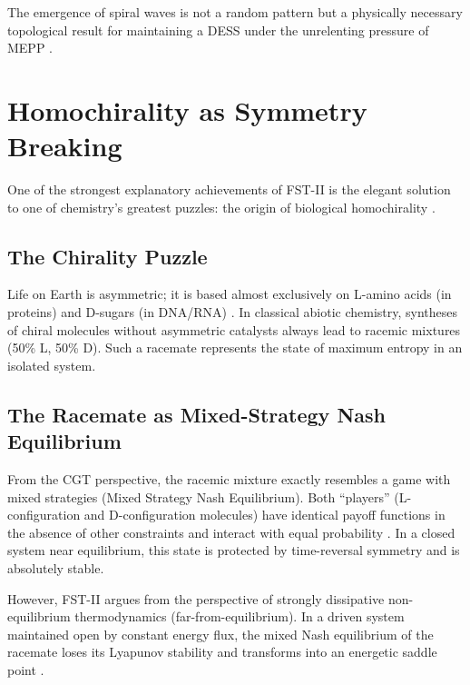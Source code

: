 \documentclass[12pt,a4paper]{article}
\theoremstyle{remark}
\begin{document}
The emergence of spiral waves is not a random pattern but a physically necessary topological result for maintaining a DESS under the unrelenting pressure of MEPP \citep{HypercycleInfinite}.

\section{Homochirality as Symmetry Breaking}
\label{sec:chirality}

One of the strongest explanatory achievements of FST-II is the elegant solution to one of chemistry's greatest puzzles: the origin of biological homochirality \citep{Biochirality}.

\subsection{The Chirality Puzzle}

Life on Earth is asymmetric; it is based almost exclusively on L-amino acids (in proteins) and D-sugars (in DNA/RNA) \citep{HomochiralityThermo}. In classical abiotic chemistry, syntheses of chiral molecules without asymmetric catalysts always lead to racemic mixtures (50\% L, 50\% D). Such a racemate represents the state of maximum entropy in an isolated system.

\subsection{The Racemate as Mixed-Strategy Nash Equilibrium}

From the CGT perspective, the racemic mixture exactly resembles a game with mixed strategies (Mixed Strategy Nash Equilibrium). Both ``players'' (L-configuration and D-configuration molecules) have identical payoff functions in the absence of other constraints and interact with equal probability \citep{TimeReversalSymmetry}. In a closed system near equilibrium, this state is protected by time-reversal symmetry and is absolutely stable.

However, FST-II argues from the perspective of strongly dissipative non-equilibrium thermodynamics (far-from-equilibrium). In a driven system maintained open by constant energy flux, the mixed Nash equilibrium of the racemate loses its Lyapunov stability and transforms into an energetic saddle point \citep{TimeReversalSymmetry}.
\end{document}
